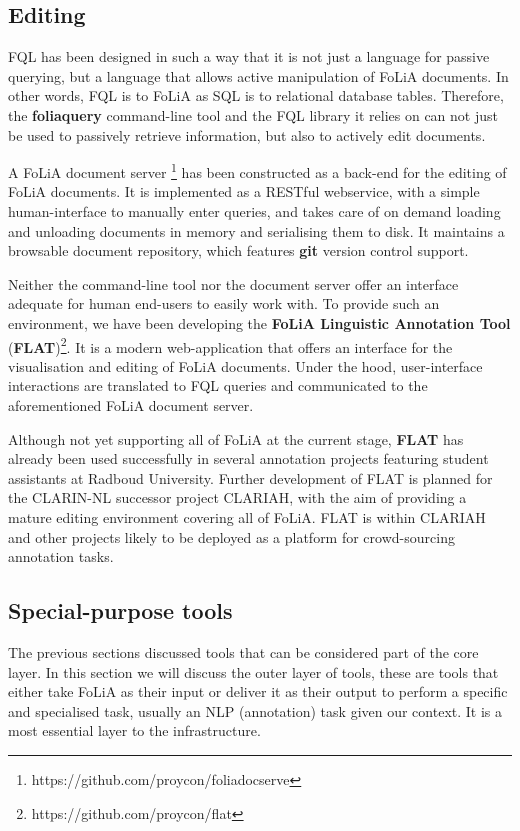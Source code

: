 \documentclass[a4paper,11pt]{article}
\begin{document}
{\subsection{Editing}

FQL has been designed in such a way that it is not just a language for passive
querying, but a language that allows active manipulation of FoLiA documents. In
other words, FQL is to FoLiA as SQL is to relational database tables.
Therefore, the \textbf{foliaquery} command-line tool and the FQL library it relies on
can not just be used to passively retrieve information, but also to actively
edit documents.

A FoLiA document server \footnote{https://github.com/proycon/foliadocserve} has
been constructed as a back-end for the editing of FoLiA documents. It is
implemented as a RESTful webservice, with a simple human-interface to manually
enter queries, and takes care of on demand loading and unloading documents in
memory and serialising them to disk. It maintains a browsable document
repository, which features \textbf{git} version control support.

Neither the command-line tool nor the document server offer an
interface adequate for human end-users to easily work with. To provide
such an environment, we have been developing the \textbf{FoLiA Linguistic Annotation Tool}
(\textbf{FLAT})\footnote{https://github.com/proycon/flat}. It is a modern
web-application that offers an interface for the visualisation and editing of
FoLiA documents. Under the hood, user-interface interactions are translated to FQL
queries and communicated to the aforementioned FoLiA document server.

Although not yet supporting all of FoLiA at the current stage, \textbf{FLAT} has already
been used successfully in several annotation projects featuring student
assistants at Radboud University. Further development of FLAT is
planned for the CLARIN-NL successor project CLARIAH, with the aim of providing
a mature editing environment covering all of FoLiA. FLAT is within CLARIAH and other projects likely to be deployed as a platform for crowd-sourcing annotation tasks.

\subsection{Special-purpose tools}

The previous sections discussed tools that can be considered part of the
core layer. In this section we will discuss the outer layer of tools, these are
tools that either take FoLiA as their input or deliver it as their output to
perform a specific and specialised task, usually an NLP (annotation) task given our context.
It is a most essential layer to the infrastructure.

}
\end{document}
